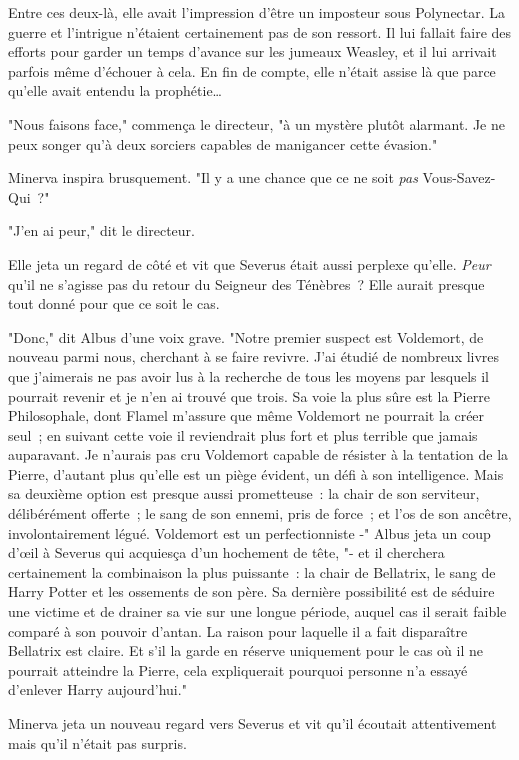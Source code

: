 Entre ces deux-là, elle avait l'impression d'être un imposteur sous Polynectar. La guerre et l'intrigue n'étaient certainement pas de son ressort. Il lui fallait faire des efforts pour garder un temps d'avance sur les jumeaux Weasley, et il lui arrivait parfois même d'échouer à cela. En fin de compte, elle n'était assise là que parce qu'elle avait entendu la prophétie…

"Nous faisons face," commença le directeur, "à un mystère plutôt alarmant. Je ne peux songer qu'à deux sorciers capables de manigancer cette évasion."

Minerva inspira brusquement. "Il y a une chance que ce ne soit \emph{pas} Vous-Savez-Qui~?"

"J'en ai peur," dit le directeur.

Elle jeta un regard de côté et vit que Severus était aussi perplexe qu'elle. \emph{Peur} qu'il ne s'agisse pas du retour du Seigneur des Ténèbres~? Elle aurait presque tout donné pour que ce soit le cas.

"Donc," dit Albus d'une voix grave. "Notre premier suspect est Voldemort, de nouveau parmi nous, cherchant à se faire revivre. J'ai étudié de nombreux livres que j'aimerais ne pas avoir lus à la recherche de tous les moyens par lesquels il pourrait revenir et je n'en ai trouvé que trois. Sa voie la plus sûre est la Pierre Philosophale, dont Flamel m'assure que même Voldemort ne pourrait la créer seul~; en suivant cette voie il reviendrait plus fort et plus terrible que jamais auparavant. Je n'aurais pas cru Voldemort capable de résister à la tentation de la Pierre, d'autant plus qu'elle est un piège évident, un défi à son intelligence. Mais sa deuxième option est presque aussi prometteuse~: la chair de son serviteur, délibérément offerte~; le sang de son ennemi, pris de force~; et l'os de son ancêtre, involontairement légué. Voldemort est un perfectionniste -" Albus jeta un coup d'œil à Severus qui acquiesça d'un hochement de tête, "- et il cherchera certainement la combinaison la plus puissante~: la chair de Bellatrix, le sang de Harry Potter et les ossements de son père. Sa dernière possibilité est de séduire une victime et de drainer sa vie sur une longue période, auquel cas il serait faible comparé à son pouvoir d'antan. La raison pour laquelle il a fait disparaître Bellatrix est claire. Et s'il la garde en réserve uniquement pour le cas où il ne pourrait atteindre la Pierre, cela expliquerait pourquoi personne n'a essayé d'enlever Harry aujourd'hui."

Minerva jeta un nouveau regard vers Severus et vit qu'il écoutait attentivement mais qu'il n'était pas surpris.

